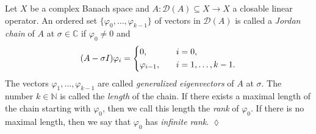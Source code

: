 \documentclass[english]{myarticle}
\begin{document}
\begin{sloppypar}
\begin{definition} \label{def:Jordanchain}
Let $X$ be a complex Banach space and $A : \mathcal{D}(A) \subseteq X \to X$ a closable linear operator. An ordered set $\{\varphi_0,\dots,\varphi_{k-1}\}$ of vectors in $\mathcal{D}(A)$ is called a \emph{Jordan chain} of $A$ at $\sigma \in \mathbb{C}$ if $\varphi_0 \neq 0$ and
\begin{equation*}
    (A-\sigma I) \varphi_i = 
    \begin{dcases}
        0, \quad &i=0, \\
        \varphi_{i-1}, \quad &i=1,\dots,k-1.
    \end{dcases}
\end{equation*}
The vectors $\varphi_1,\dots,\varphi_{k-1}$ are called \emph{generalized eigenvectors} of $A$ at $\sigma$. The number $k \in \mathbb{N}$ is called the \emph{length} of the chain. If there exists a maximal length of the chain starting with $\varphi_0$, then we call this length the \emph{rank} of $\varphi_0$. If there is no maximal length, then we say that $\varphi_0$ has \emph{infinite rank}. \hfill $\lozenge$
\end{definition}


\end{sloppypar}
\end{document}
